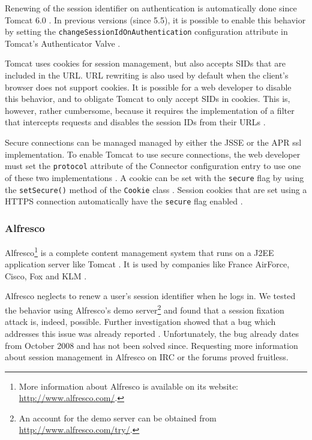 Renewing of the session identifier on authentication is automatically done since Tomcat 6.0 \cite{TomcatAuthentication6}. In previous versions (since 5.5), it is possible to enable this behavior by setting the \texttt{changeSessionIdOnAuthentication} configuration attribute in Tomcat's Authenticator Valve \cite{TomcatAuthentication5}.

Tomcat uses cookies for session management, but also accepts SIDs that are included in the URL. URL rewriting is also used by default when the client's browser does not support cookies. It is possible for a web developer to disable this behavior, and to obligate Tomcat to only accept SIDs in cookies. This is, however, rather cumbersome, because it requires the implementation of a filter that intercepts requests and disables the session IDs from their URLs \cite{Condit2006}.

Secure connections can be managed managed by either the JSSE or the APR \gls{ssl} implementation. To enable Tomcat to use secure connections, the web developer must set the \texttt{protocol} attribute of the Connector configuration entry to use one of these two implementations \cite{TomcatSSL}. A cookie can be set with the \texttt{secure} flag by using the \texttt{setSecure()} method of the \texttt{Cookie} class \cite{TomcatCookie}. Session cookies that are set using a HTTPS connection automatically have the \texttt{secure} flag enabled \cite{Funk2004}.

\subsubsection{Alfresco}

Alfresco\footnote{More information about Alfresco is available on its website: \url{http://www.alfresco.com/}.} is a complete content management system that runs on a J2EE application server like Tomcat \cite{TomcatPoweredBy}. It is used by companies like France AirForce, Cisco, Fox and KLM \cite{AlfrescoPoweredBy}.

Alfresco neglects to renew a user's session identifier when he logs in. We tested the behavior using Alfresco's demo server\footnote{An account for the demo server can be obtained from \url{http://www.alfresco.com/try/}.} and found that a session fixation attack is, indeed, possible. Further investigation showed that a bug which addresses this issue was already reported \cite{AlfrescoSessionFixation}. Unfortunately, the bug already dates from October 2008 and has not been solved since. Requesting more information about session management in Alfresco on IRC or the forums proved fruitless.

